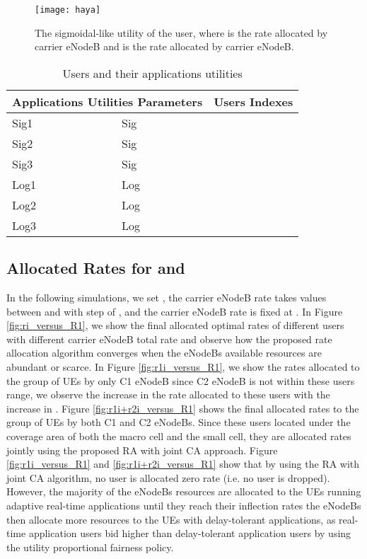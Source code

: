 \documentclass[journal]{IEEEtran} 		\usepackage{amsmath,amssymb}
\begin{document}
\begin{figure}[tb]
\centering
\texttt{[image: haya]}
\caption{The sigmoidal-like utility  of the  user, where  is the rate allocated by  carrier eNodeB and  is the rate allocated by  carrier eNodeB.}
\label{fig:Utility3D}
\end{figure}
\begin {table}[]
\caption {Users and their applications utilities}
\label{table:parameters}
\begin{center}
\renewcommand{\arraystretch}{1.4} \begin{tabular}{| l | l | l | }
\hline
  \multicolumn{2}{|c|}{Applications Utilities Parameters} & \multicolumn{1}{|c|}{Users Indexes} \\  \hline
  Sig1 & Sig   &   \\ \hline
  Sig2 & Sig  &   \\ \hline
  Sig3 & Sig  &    \\ \hline
  Log1 & Log  &    \\ \hline
  Log2 & Log  &    \\ \hline
  Log3 & Log  &  \\ \hline
\end{tabular}
\end{center}
\end {table}
\subsection{Allocated Rates for  and }
In the following simulations, we set , the  carrier eNodeB rate  takes values between  and  with step of , and the  carrier eNodeB rate is fixed at . In Figure \ref{fig:ri_versus_R1}, we show the final allocated optimal rates  of different users with different  carrier eNodeB total rate  and observe how the proposed rate allocation algorithm converges when the eNodeBs available resources are abundant or scarce. In Figure \ref{fig:r1i_versus_R1}, we show the rates allocated to the  group of UEs by only C1 eNodeB since C2 eNodeB is not within these users range, we observe the increase in the rate allocated to these users with the increase in . Figure \ref{fig:r1i+r2i_versus_R1} shows the final allocated rates to the  group of UEs by both C1 and C2 eNodeBs. Since these users located under the coverage area of both the macro cell and the small cell, they are allocated rates jointly using the proposed
RA with joint CA approach. Figure \ref{fig:r1i_versus_R1} and \ref{fig:r1i+r2i_versus_R1} show that by using the RA with joint CA algorithm, no user is allocated zero rate (i.e. no user is dropped). However, the majority of the eNodeBs resources are allocated to the UEs running adaptive real-time applications until they reach their inflection rates the eNodeBs then allocate more resources to the UEs with delay-tolerant applications, as real-time application users bid higher than delay-tolerant application users by using the utility proportional fairness policy.
\end{document}
